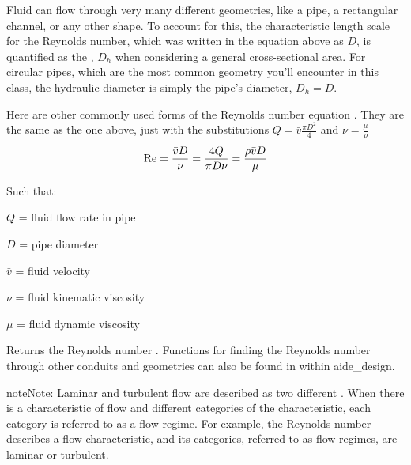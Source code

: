 \documentclass[letterpaper,10pt,english]{sphinxmanual}
\begin{document}
Fluid can flow through very many different geometries, like a pipe, a rectangular channel, or any other shape. To account for this, the characteristic length scale for the Reynolds number, which was written in the equation above as \(D\), is quantified as the , \(D_h\) when considering a general cross-sectional area. For circular pipes, which are the most common geometry you’ll encounter in this class, the hydraulic diameter is simply the pipe’s diameter, \(D_h = D\).

Here are other commonly used forms of the Reynolds number equation . They are the same as the one above, just with the substitutions \(Q = \bar v \frac{\pi D^2}{4}\) and \(\nu = \frac{\mu}{\rho}\)
\begin{equation}\label{equation:Fluids_Review/Fluids_Review_Design:Fluids_Review/Fluids_Review_Design:5}
\begin{split}{\rm{Re}} = \frac{\bar vD}{\nu} = \frac{4Q}{\pi D\nu} = \frac{\rho \bar vD}{\mu}\end{split}
\end{equation}
\begin{DUlineblock}{0em}
\item[] Such that:
\item[] \(Q\) = fluid flow rate in pipe
\item[] \(D\) = pipe diameter
\item[] \(\bar v\) = fluid velocity
\item[] \(\nu\) = fluid kinematic viscosity
\item[] \(\mu\) = fluid dynamic viscosity
\end{DUlineblock}




  Returns the Reynolds number . Functions for finding the Reynolds number through other conduits and geometries can also be found in  within aide\_design.



\begin{sphinxadmonition}{note}{Note:}
Laminar and turbulent flow are described as two different . When there is a characteristic of flow and different categories of the characteristic, each category is referred to as a flow regime. For example, the Reynolds number describes a flow characteristic, and its categories, referred to as flow regimes, are laminar or turbulent.
\end{sphinxadmonition}
\end{document}
